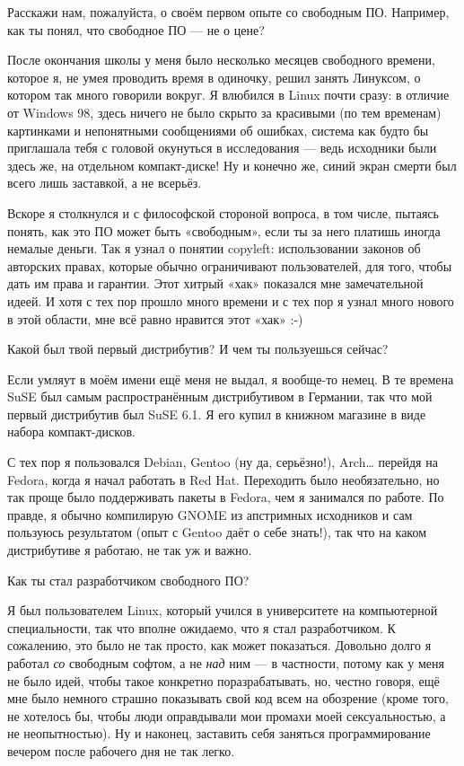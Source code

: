 \documentclass[10pt, a5paper]{article}
\begin{document}
\begin{Parallel}[p]{}{}
{\q Расскажи нам, пожалуйста, о своём первом опыте со свободным ПО. Например, как ты понял, что свободное ПО — не о цене?

\a После окончания школы у меня было несколько месяцев свободного времени, которое я, не умея проводить время в одиночку, решил занять Линуксом, о котором так много говорили вокруг. Я влюбился в Linux почти сразу: в отличие от Windows 98, здесь ничего не было скрыто за красивыми (по тем временам) картинками и непонятными сообщениями об ошибках, система как будто бы приглашала тебя с головой окунуться в исследования — ведь исходники были здесь же, на отдельном компакт-диске! Ну и конечно же, синий экран смерти был всего лишь заставкой\fakefootnote{}, а не всерьёз.

Вскоре я столкнулся и с философской стороной вопроса, в том числе, пытаясь понять, как это ПО может быть «свободным», если ты за него платишь иногда немалые деньги. Так я узнал о понятии copyleft: использовании законов об авторских правах, которые обычно ограничивают пользователей, для того, чтобы дать им права и гарантии. Этот хитрый «хак» показался мне замечательной идеей. И хотя с тех пор прошло много времени и с тех пор я узнал много нового в этой области, мне всё равно нравится этот «хак» :-)

\q Какой был твой первый дистрибутив? И чем ты пользуешься сейчас?

\a Если умляут в моём имени ещё меня не выдал, я вообще-то немец. В те времена SuSE был самым распространённым дистрибутивом в Германии, так что мой первый дистрибутив был SuSE 6.1\fakefootnote{}. Я его купил в книжном магазине в виде набора компакт-дисков.

С тех пор я пользовался Debian, Gentoo (ну да, серьёзно!), Arch… перейдя на Fedora, когда я начал работать в Red Hat. Переходить было необязательно, но так проще было поддерживать пакеты в Fedora, чем я занимался по работе. По правде, я обычно компилирую GNOME из апстримных исходников и сам пользуюсь результатом (опыт с Gentoo даёт о себе знать!)\fakefootnote{}, так что на каком дистрибутиве я работаю, не так уж и важно.

\q Как ты стал разработчиком свободного ПО?

\a Я был пользователем Linux, который учился в университете на компьютерной специальности, так что вполне ожидаемо, что я стал разработчиком. К сожалению, это было не так просто, как может показаться. Довольно долго я работал \emph{со} свободным софтом, а не \emph{над} ним — в частности, потому как у меня не было идей, чтобы такое конкретно поразрабатывать, но, честно говоря, ещё мне было немного страшно показывать свой код всем на обозрение (кроме того, не хотелось бы, чтобы люди оправдывали мои промахи моей сексуальностью, а не неопытностью). Ну и наконец, заставить себя заняться программирование вечером после рабочего дня не так легко.

}
\end{Parallel}
\end{document}
